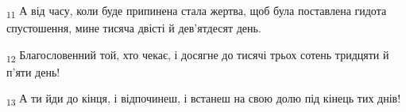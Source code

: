 \begin{tcolorbox}
\textsubscript{11} А від часу, коли буде припинена стала жертва, щоб була поставлена гидота спустошення, мине тисяча двісті й дев'ятдесят день.
\end{tcolorbox}
\begin{tcolorbox}
\textsubscript{12} Благословенний той, хто чекає, і досягне до тисячі трьох сотень тридцяти й п'яти день!
\end{tcolorbox}
\begin{tcolorbox}
\textsubscript{13} А ти йди до кінця, і відпочинеш, і встанеш на свою долю під кінець тих днів!
\end{tcolorbox}
